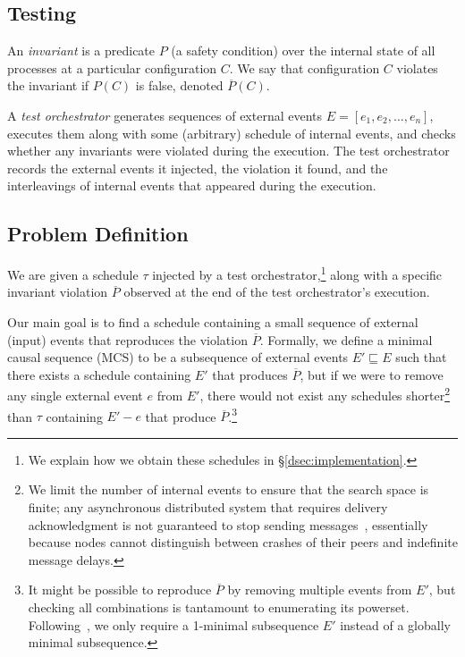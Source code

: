 \subsection{Testing}

An {\em invariant} is a predicate $P$ (a safety
condition) over the internal state of all processes at a particular
configuration $C$. We say that configuration
$C$ violates the invariant if $P\left(C\right)$ is false, denoted $\overline{P}\left(C\right)$.

A {\em test orchestrator} generates sequences of external events
$E = [ e_1, e_2, \ldots, e_n ]$, executes them along with some
(arbitrary) schedule of internal
events, and checks whether any invariants were violated during the execution.
The test orchestrator records the external events it injected, the
violation it found, and the
interleavings of internal events that appeared during the execution.


\subsection{Problem Definition}

We are given a schedule $\tau$ injected by a test orchestrator,\footnote{We
explain how we obtain these schedules in \S\ref{dsec:implementation}.} along
with a specific invariant violation $\overline{P}$ observed at the end of the
test orchestrator's execution.

Our main goal is to find a schedule containing a small sequence of
external (input) events that reproduces the violation $\overline{P}$.
Formally, we define a minimal causal sequence (MCS)
to be a subsequence of external events $E' \sqsubseteq E$ such that there exists
a schedule containing $E'$ that produces
$\overline{P}$, but if we were to remove any
single external event $e$ from $E'$, there would not exist any schedules
shorter\footnote{We limit the number of internal events to ensure
that the search space is finite; any asynchronous
distributed system that requires
delivery acknowledgment is not guaranteed
to stop sending messages~\cite{aguilera1997heartbeat}, essentially because nodes cannot distinguish
between crashes of their peers and indefinite message delays.} than $\tau$
containing $E' - e$ that produce
$\overline{P}$.\footnote{It might be possible to reproduce $\overline{P}$ by
removing multiple events from $E'$,
but checking all combinations is tantamount to enumerating its powerset.
Following~\cite{Zeller:2002:SIF:506201.506206}, we
only require a 1-minimal subsequence $E'$ instead of a globally minimal
subsequence.}

